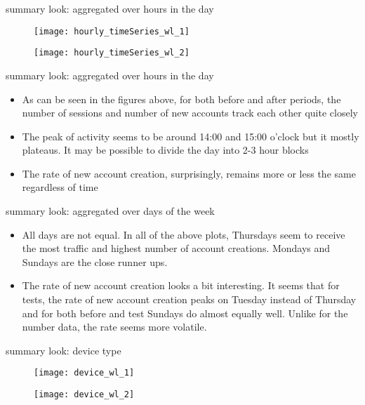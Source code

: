 \documentclass{beamer}
\begin{document}
		\begin{frame}{summary look: aggregated over hours in the day}
			\begin{figure}[H]
				\centering
				\texttt{[image: hourly\_timeSeries\_wl\_1]}
			\end{figure}
			
			\begin{figure}[H]
				\centering
				\texttt{[image: hourly\_timeSeries\_wl\_2]}
			\end{figure}
		\end{frame}
		
		\begin{frame}{summary look: aggregated over hours in the day}
			\begin{itemize}
				\item As can be seen in the figures above, for both before and after periods, the number of sessions and number of new accounts track each other quite closely
				
				\item The peak of activity seems to be around 14:00 and 15:00 o'clock but it mostly plateaus. It may be possible to divide the day into 2-3 hour blocks
				
				\item The rate of new account creation, surprisingly, remains more or less the same regardless of time
			\end{itemize}
		\end{frame}		

		\begin{frame}{summary look: aggregated over days of the week}
			\begin{itemize}
				\item All days are not equal. In all of the above plots, Thursdays seem to receive the most traffic and highest number of account creations. Mondays and Sundays are the close runner ups. 
				
				\item The rate of new account creation looks a bit interesting. It seems that for tests, the rate of new account creation peaks on Tuesday instead of Thursday and for both before and test Sundays do almost equally well. Unlike for the number data, the rate seems more volatile.
			\end{itemize}
		\end{frame}
		
		\begin{frame}{summary look: device type}
			\begin{figure}[H]
				\centering
				\texttt{[image: device\_wl\_1]}
			\end{figure}
			
			\begin{figure}[H]
				\centering
				\texttt{[image: device\_wl\_2]}
			\end{figure}
		\end{frame}
		
\end{document}
